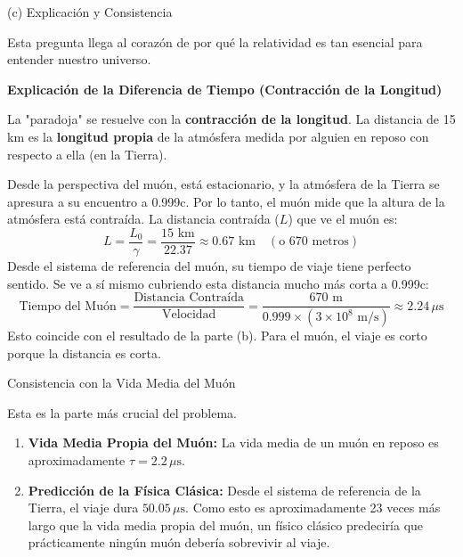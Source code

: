 \documentclass[11pt,a4paper]{article}
\begin{document}
\begin{enumerate}
\begin{itemize}
\textbf{}{(c) Explicación y Consistencia}

Esta pregunta llega al corazón de por qué la relatividad es tan esencial para entender nuestro universo.

\textbf{Explicación de la Diferencia de Tiempo (Contracción de la Longitud)}

La "paradoja" se resuelve con la \textbf{contracción de la longitud}. La distancia de 15 km es la \textbf{longitud propia} de la atmósfera medida por alguien en reposo con respecto a ella (en la Tierra).

Desde la perspectiva del muón, está estacionario, y la atmósfera de la Tierra se apresura a su encuentro a 0.999c. Por lo tanto, el muón mide que la altura de la atmósfera está contraída. La distancia contraída ($L$) que ve el muón es:
\[ L = \frac{L_0}{\gamma} = \frac{15 \text{ km}}{22.37} \approx 0.67 \text{ km} \quad (\text{o 670 metros}) \]
Desde el sistema de referencia del muón, su tiempo de viaje tiene perfecto sentido. Se ve a sí mismo cubriendo esta distancia mucho más corta a 0.999c:
\[ \text{Tiempo del Muón} = \frac{\text{Distancia Contraída}}{\text{Velocidad}} = \frac{670 \text{ m}}{0.999 \times (3 \times 10^8 \text{ m/s})} \approx 2.24 \, \mu\text{s} \]
Esto coincide con el resultado de la parte (b). Para el muón, el viaje es corto porque la distancia es corta.

\textbf{}{Consistencia con la Vida Media del Muón}

Esta es la parte más crucial del problema.
\begin{enumerate}
    \item \textbf{Vida Media Propia del Muón:} La vida media de un muón en reposo es aproximadamente $\tau = 2.2 \, \mu\text{s}$.

    \item \textbf{Predicción de la Física Clásica:} Desde el sistema de referencia de la Tierra, el viaje dura $50.05 \, \mu\text{s}$. Como esto es aproximadamente 23 veces más largo que la vida media propia del muón, un físico clásico predeciría que prácticamente ningún muón debería sobrevivir al viaje.


\end{enumerate}
\end{itemize}
\end{enumerate}
\end{document}
